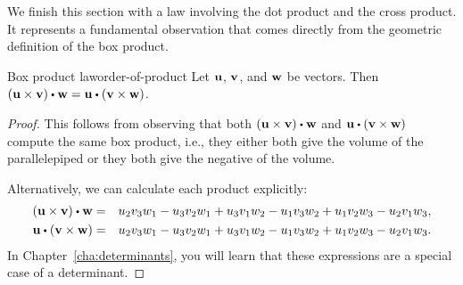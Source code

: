 We finish this section with a law involving the dot product and the
cross product. It represents a fundamental observation that comes
directly from the geometric definition of the box product.

\begin{proposition}{Box product law}{order-of-product}
  Let $\vect{u}$, $\vect{v}$, and $\vect{w}$ be vectors. Then
  $(\vect{u}\times\vect{v}) \dotprod \vect{w}=\vect{u}\dotprod
  (\vect{v}\times \vect{w})$.
\end{proposition}

\begin{proof}
  This follows from observing that both
  $(\vect{u}\times \vect{v}) \dotprod \vect{w}$ and
  $\vect{u}\dotprod (\vect{v}\times \vect{w})$ compute the same
  box product, i.e., they either both give the volume of the
  parallelepiped or they both give the negative of the volume.

  Alternatively, we can calculate each product explicitly:
  \begin{eqnarray*}
    (\vect{u}\times \vect{v}) \dotprod \vect{w}
    &=&
        u_2v_3w_1 - u_3v_2w_1
        + u_3v_1w_2 - u_1v_3w_2
        + u_1v_2w_3 - u_2v_1w_3, \\
    \vect{u}\dotprod (\vect{v}\times \vect{w})
    &=&
        u_2v_3w_1 - u_3v_2w_1
        + u_3v_1w_2 - u_1v_3w_2
        + u_1v_2w_3 - u_2v_1w_3.
  \end{eqnarray*}
  In Chapter~\ref{cha:determinants}, you will learn that these
  expressions are a special case of a determinant.
\end{proof}

